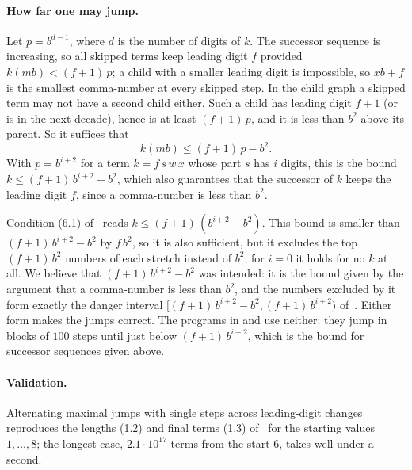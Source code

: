 \paragraph{How far one may jump.}
Let $p = b^{d-1}$, where $d$ is the number of digits of $k$. The successor sequence is increasing,
so all skipped terms keep leading digit $f$ provided $k(mb) < (f+1)\,p$; a child with a smaller
leading digit is impossible, so $x b + f$ is the smallest comma-number at every skipped step. In the
child graph a skipped term may not have a second child either. Such a child has leading digit
$f + 1$ (or is in the next decade), hence is at least $(f+1)\,p$, and it is less than $b^2$ above
its parent. So it suffices that
\[
  k(mb) \le (f+1)\,p - b^2 .
\]
With $p = b^{i+2}$ for a term $k = f\,s\,w\,x$ whose part $s$ has $i$ digits, this is the bound
$k \le (f+1)\,b^{i+2} - b^2$, which also guarantees that the successor of $k$ keeps the leading
digit $f$, since a comma-number is less than $b^2$.

\begin{remark}
  Condition (6.1) of~\cite{comma} reads $k \le (f+1)\,(b^{i+2} - b^2)$. This bound is smaller than
  $(f+1)\,b^{i+2} - b^2$ by $f\,b^2$, so it is also sufficient, but it excludes the top
  $(f+1)\,b^2$ numbers of each stretch instead of $b^2$; for $i = 0$ it holds for no $k$ at all. We
  believe that $(f+1)\,b^{i+2} - b^2$ was intended: it is the bound given by the argument
  that a comma-number is less than $b^2$, and the numbers excluded by it form exactly the danger
  interval $[(f+1)\,b^{i+2} - b^2, (f+1)\,b^{i+2})$ of~\cite{dbts}. Either form makes the jumps
  correct. The programs in  and  use neither: they jump in blocks of
  $100$ steps until just below $(f+1)\,b^{i+2}$, which is the bound for successor sequences given
  above.
\end{remark}

\paragraph{Validation.}
Alternating maximal jumps with single steps across leading-digit changes reproduces the lengths
(1.2) and final terms (1.3) of~\cite{comma} for the starting values $1, \dots, 8$; the longest
case, $2.1 \cdot 10^{17}$ terms from the start $6$, takes well under a second.
